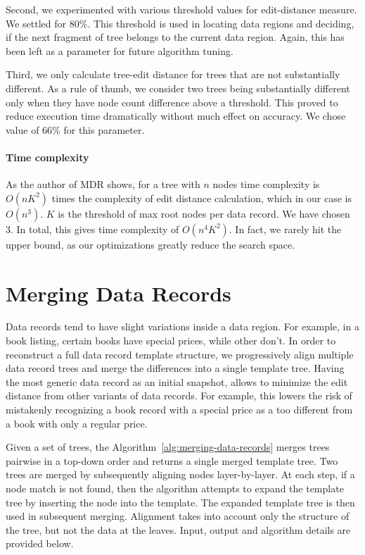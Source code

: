 Second, we experimented with various threshold values for edit-distance measure. We settled for $80\%$. This threshold is used in locating data regions and deciding, if the next fragment of tree belongs to the current data region. Again, this has been left as a parameter for future algorithm tuning.

Third, we only calculate tree-edit distance for trees that are not substantially different. As a rule of thumb, we consider two trees being substantially different only when they have node count difference above a threshold. This proved to reduce execution time dramatically without much effect on accuracy. We chose value of $66\%$ for this parameter.

\paragraph{Time complexity} As the author of MDR shows, for a tree with $n$ nodes time complexity is $O(n K^2)$ times the complexity of edit distance calculation, which in our case is $O(n^3)$. $K$ is the threshold of max root nodes per data record. We have chosen 3. In total, this gives time complexity of $O(n^4 K^2)$. In fact, we rarely hit the upper bound, as our optimizations greatly reduce the search space.


\section{Merging Data Records}
\label{sec:merging-data-records}

Data records tend to have slight variations inside a data region. For example, in a book listing, certain books have special prices, while other don't. In order to reconstruct a full data record template structure, we progressively align multiple data record trees and merge the differences into a single template tree. Having the most generic data record as an initial snapshot, allows to minimize the edit distance from other variants of data records. For example, this lowers the risk of mistakenly recognizing a book record with a special price as a too different from a book with only a regular price. 

Given a set of trees, the Algorithm~\ref{alg:merging-data-records} merges trees pairwise in a top-down order and returns a single merged template tree. Two trees are merged by subsequently aligning nodes layer-by-layer. At each step, if a node match is not found, then the algorithm attempts to expand the template tree by inserting the node into the template. The expanded template tree is then used in subsequent merging. Alignment takes into account only the structure of the tree, but not the data at the leaves. Input, output and algorithm details are provided below.

